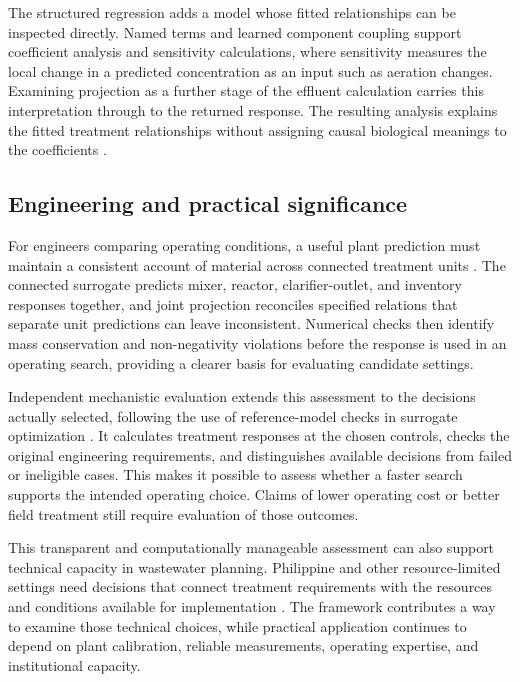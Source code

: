 The structured regression adds a model whose fitted relationships can be inspected directly. Named terms and learned component coupling support coefficient analysis and sensitivity calculations, where sensitivity measures the local change in a predicted concentration as an input such as aeration changes. Examining projection as a further stage of the effluent calculation carries this interpretation through to the returned response. The resulting analysis explains the fitted treatment relationships without assigning causal biological meanings to the coefficients \citep{Brunton2016,Selerio2026}.

\subsection{Engineering and practical significance}

For engineers comparing operating conditions, a useful plant prediction must maintain a consistent account of material across connected treatment units \citep{Henze2008,Alex2008}. The connected surrogate predicts mixer, reactor, clarifier-outlet, and inventory responses together, and joint projection reconciles specified relations that separate unit predictions can leave inconsistent. Numerical checks then identify mass conservation and non-negativity violations before the response is used in an operating search, providing a clearer basis for evaluating candidate settings.

Independent mechanistic evaluation extends this assessment to the decisions actually selected, following the use of reference-model checks in surrogate optimization \citep{Alexandrov1998,Pedrozo2025}. It calculates treatment responses at the chosen controls, checks the original engineering requirements, and distinguishes available decisions from failed or ineligible cases. This makes it possible to assess whether a faster search supports the intended operating choice. Claims of lower operating cost or better field treatment still require evaluation of those outcomes.

This transparent and computationally manageable assessment can also support technical capacity in wastewater planning. Philippine and other resource-limited settings need decisions that connect treatment requirements with the resources and conditions available for implementation \citep{Tabios2020,DamalerioBarriers2022,Ulrich2009}. The framework contributes a way to examine those technical choices, while practical application continues to depend on plant calibration, reliable measurements, operating expertise, and institutional capacity.

